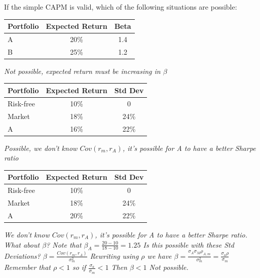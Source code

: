 \documentclass[11pt]{article}
\theoremstyle{definition}
\begin{document}
\begin{shaded}

    If the simple CAPM is valid, which of the following situations are possible:

    \footnotesize
            \begin{tabular}{lcc}
                \toprule
                Portfolio & Expected Return & Beta\\
                \midrule
                A & 20\% & 1.4\\
                B & 25\% & 1.2\\
                \bottomrule
            \end{tabular}

            \textit{Not possible, expected return must be increasing in $\beta$}



            \begin{tabular}{lcc}
                \toprule
                Portfolio & Expected Return & Std Dev\\
                \midrule
                Risk-free & 10\% & 0\\
                Market & 18\% & 24\%\\
                A & 16\% & 22\%\\
                \bottomrule
            \end{tabular}

            \textit{Possible, we don't know $Cov(r_m,r_A)$, it's possible for A to have a better Sharpe ratio}

            \begin{tabular}{lcc}
                \toprule
                Portfolio & Expected Return & Std Dev\\
                \midrule
                Risk-free & 10\% & 0\\
                Market & 18\% & 24\%\\
                A & 20\% & 22\%\\
                \bottomrule
            \end{tabular}

            \textit{We don't know $Cov(r_m,r_A)$, it's possible for A to have a better Sharpe ratio.   What about $\beta$?   Note that $\beta_A = \frac{20-10}{18-10} = 1.25$  Is this possible with these Std Deviations?   $\beta=\frac{Cov(r_m,r_A)}{\sigma_m^2}$  Rewriting using $\rho$ we have $\beta=\frac{\sigma_A\sigma_M\rho_{A,m}}{\sigma_m^2}=\frac{\sigma_a\rho}{\sigma_m}$ Remember that $\rho<1$ so if $\frac{\sigma_a}{\sigma_m}<1$ Then $\beta<1$   Not possible.}


\end{shaded}
\end{document}
